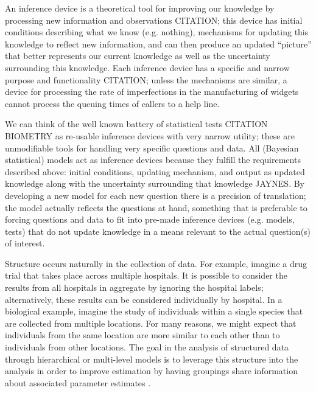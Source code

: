 An inference device is a theoretical tool for improving our knowledge by processing new information and observations \citep{McElreath2016} CITATION; this device has initial conditions describing what we know (e.g. nothing), mechanisms for updating this knowledge to reflect new information, and can then produce an updated ``picture'' that better represents our current knowledge as well as the uncertainty surrounding this knowledge. Each inference device has a specific and narrow purpose and functionality \citep{McElreath2016} CITATION; unless the mechanisms are similar, a device for processing the rate of imperfections in the manufacturing of widgets cannot process the queuing times of callers to a help line.  

We can think of the well known battery of statistical tests CITATION \uppercase{Biometry} as re-usable inference devices with very narrow utility; these are unmodifiable tools for handling very specific questions and data. All (Bayesian statistical) models act as inference devices because they fulfill the requirements described above: initial conditions, updating mechanism, and output as updated knowledge along with the uncertainty surrounding that knowledge \citep{McElreath2016} JAYNES. By developing a new model for each new question there is a precision of translation; the model actually reflects the questions at hand, something that is preferable to forcing questions and data to fit into pre-made inference devices (e.g. models, tests) that do not update knowledge in a means relevant to the actual question(s) of interest.

Structure occurs naturally in the collection of data. For example, imagine a drug trial that takes place across multiple hospitals. It is possible to consider the results from all hospitals in aggregate by ignoring the hospital labels; alternatively, these results can be considered individually by hospital. In a biological example, imagine the study of individuals within a single species that are collected from multiple locations. For many reasons, we might expect that individuals from the same location are more similar to each other than to individuals from other locations. The goal in the analysis of structured data through hierarchical or multi-level models is to leverage this structure into the analysis in order to improve estimation by having groupings share information about associated parameter estimates \citep{Gelman2013d,McElreath2016}. 


